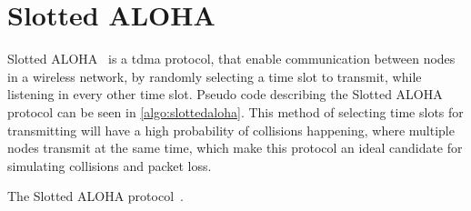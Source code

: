 
\section{Slotted ALOHA}\label{sec:saloha}
Slotted ALOHA~\cite{Roberts:1975:APS:1024916.1024920} is a \gls{tdma} protocol, that enable communication between nodes in a wireless network, by randomly selecting a time slot to transmit, while listening in every other time slot. Pseudo code describing the Slotted ALOHA protocol can be seen in \autoref{algo:slottedaloha}. This method of selecting time slots for transmitting will have a high probability of collisions happening, where multiple nodes transmit at the same time, which make this protocol an ideal candidate for simulating collisions and packet loss.\medbreak

\begin{algorithm}[ht]
    \DontPrintSemicolon


    \caption{The Slotted ALOHA protocol~\cite{Roberts:1975:APS:1024916.1024920}.}
    \label{algo:slottedaloha}
\end{algorithm}

